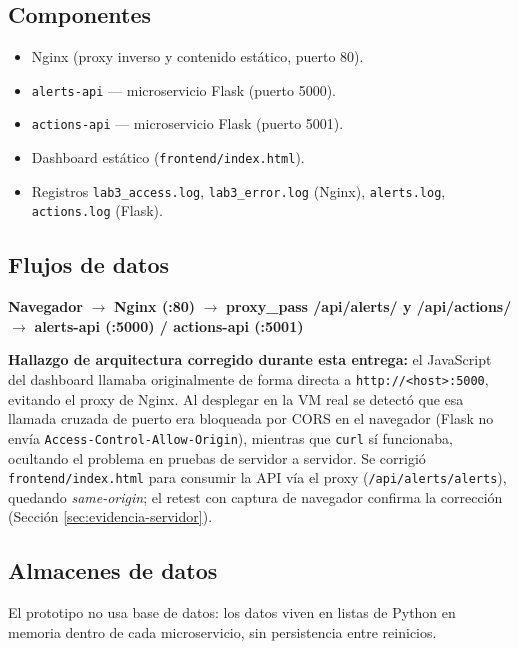 \documentclass[journal]{IEEEtran}
\begin{document}
\subsection{Componentes}

\begin{itemize}
    \item Nginx (proxy inverso y contenido estático, puerto 80).
    \item \texttt{alerts-api} --- microservicio Flask (puerto 5000).
    \item \texttt{actions-api} --- microservicio Flask (puerto 5001).
    \item Dashboard estático (\texttt{frontend/index.html}).
    \item Registros \texttt{lab3\_access.log}, \texttt{lab3\_error.log}
    (Nginx), \texttt{alerts.log}, \texttt{actions.log} (Flask).
\end{itemize}

\subsection{Flujos de datos}

\begin{center}
\textbf{Navegador}
$\rightarrow$
\textbf{Nginx (:80)}
$\rightarrow$
\textbf{proxy\_pass /api/alerts/ y /api/actions/}
$\rightarrow$
\textbf{alerts-api (:5000) / actions-api (:5001)}
\end{center}

\textbf{Hallazgo de arquitectura corregido durante esta entrega:} el
JavaScript del dashboard llamaba originalmente de forma directa a
\texttt{http://<host>:5000}, evitando el proxy de Nginx. Al desplegar en la VM
real se detectó que esa llamada cruzada de puerto era bloqueada por CORS en el
navegador (Flask no envía \texttt{Access-Control-Allow-Origin}), mientras que
\texttt{curl} sí funcionaba, ocultando el problema en pruebas de servidor a
servidor. Se corrigió \texttt{frontend/index.html} para consumir la API vía
el proxy (\texttt{/api/alerts/alerts}), quedando \textit{same-origin}; el
retest con captura de navegador confirma la corrección (Sección
\ref{sec:evidencia-servidor}).

\subsection{Almacenes de datos}

El prototipo no usa base de datos: los datos viven en listas de Python en
memoria dentro de cada microservicio, sin persistencia entre reinicios.
\end{document}

